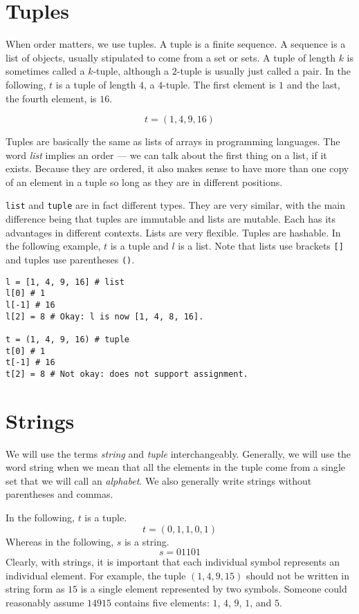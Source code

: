 \documentclass{iansnotes}
\begin{document}
\section{Tuples}
  When order matters, we use tuples.
  A tuple is a finite sequence\autocite[6]{sipser}.
  A sequence is a list of objects, usually stipulated to come from a set or sets.
  A tuple of length $k$ is sometimes called a $k$-tuple, although a $2$-tuple is usually just called a pair.
  In the following, $t$ is a tuple of length $4$, a $4$-tuple.
  The first element is $1$ and the last, the fourth element, is $16$.

  \[ t = (1, 4, 9, 16) \]

  Tuples are basically the same as lists of arrays in programming languages.
  The word \emph{list} implies an order --- we can talk about the first thing on a list, if it exists.
  Because they are ordered, it also makes sense to have more than one copy of an element in a tuple so long as they are in different positions.

   \texttt{list} and \texttt{tuple} are in fact different types.
  They are very similar, with the main difference being that tuples are immutable and lists are mutable.
  Each has its advantages in different contexts.
  Lists are very flexible.
  Tuples are hashable.
  In the following example, $t$ is a tuple and $l$ is a list.
  Note that lists use brackets \texttt{[]} and tuples use parentheses \texttt{()}.

\begin{verbatim}
l = [1, 4, 9, 16] # list
l[0] # 1
l[-1] # 16
l[2] = 8 # Okay: l is now [1, 4, 8, 16].

t = (1, 4, 9, 16) # tuple
t[0] # 1
t[-1] # 16
t[2] = 8 # Not okay: does not support assignment.
\end{verbatim}


\section{Strings}
  We will use the terms \emph{string} and \emph{tuple} interchangeably.
  Generally, we will use the word string when we mean that all the elements in the tuple come from a single set that we will call an \emph{alphabet}.
  We also generally write strings without parentheses and commas.
  
  In the following, $t$ is a tuple.
  \[ t = (0, 1, 1, 0, 1) \]
  Whereas in the following, $s$ is a string.
  \[ s = 01101 \]
  Clearly, with strings, it is important that each individual symbol represents an individual element.
  For example, the tuple $(1, 4, 9 ,15)$ should not be written in string form as $15$ is a single element represented by two symbols.
  Someone could reasonably assume $14915$ contains five elements: $1$, $4$, $9$, $1$, and $5$.
\end{document}
